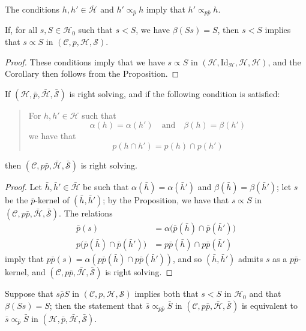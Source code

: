 \documentclass[a4paper,fleqn]{article}
\theoremstyle{plain}
\newenvironment{corollary}[1]
  {\renewcommand\theinnercorollary{#1}\innercorollary}
  {\endinnercorollary}
\theoremstyle{definition}
\newcommand{\textand}{\quad\text{and}\quad}
\newcommand{\CC}{\mathcal{C}}
\newcommand{\HH}{\mathcal{H}}
\newcommand{\bHH}{\bar{\HH}}
\renewcommand{\SS}{\mathcal{S}}
\newcommand{\bSS}{\bar{\SS}}
\newcommand{\relrhobar}{\mathrel{\bar{\rho}}}
\newcommand{\subs}{\mathrel{\propto}}
\newcommand{\Id}{\mathrm{Id}}
\begin{document}
\begin{corollary}{1}
  The conditions $h,h'\in\bHH$ and $h'\subs_{\bar{p}}h$ imply that $h'\subs_{p\bar{p}}h$.
\end{corollary}

\begin{corollary}{2}
  If, for all $s,S\in\HH_0$ such that $s<S$, we have $\beta(Ss)=S$, then $s<S$ implies that $s\subs S$ in $(\CC,p,\HH,\SS)$.
\end{corollary}

\begin{proof}
  These conditions imply that we have $s\subs S$ in $(\HH,\Id_\HH,\HH,\HH)$, and the Corollary then follows from the Proposition.
\end{proof}

\begin{corollary}{3}
  If $(\HH,\bar{p},\bHH,\bSS)$ is right solving, and if the following condition is satisfied:
  \begin{quote}
    For $h,h'\in\HH$ such that
    \[
      \alpha(h)=\alpha(h')
      \textand
      \beta(h)=\beta(h')
    \]
    we have that
    \[
      p(h\cap h')
      = p(h)\cap p(h')
    \]
  \end{quote}
  then $(\CC,p\bar{p},\bHH,\bSS)$ is right solving.
\end{corollary}

\begin{proof}
  Let $\bar{h},\bar{h}'\in\bHH$ be such that $\alpha(\bar{h})=\alpha(\bar{h}')$ and $\beta(\bar{h})=\beta(\bar{h}')$;
  let $s$ be the $\bar{p}$-kernel of $(\bar{h},\bar{h}')$;
  by the Proposition, we have that $s\subs S$ in $(\CC,p\bar{p},\bHH,\bSS)$.
  The relations
  \[
    \begin{aligned}
      \bar{p}(s)
      &= \alpha\big(\bar{p}(\bar{h})\cap\bar{p}(\bar{h}')\big)
    \\p\big(\bar{p}(\bar{h})\cap\bar{p}(\bar{h}')\big)
      &= p\bar{p}(\bar{h})\cap p\bar{p}(\bar{h}')
    \end{aligned}
  \]
  imply that $p\bar{p}(s)=\alpha(p\bar{p}(\bar{h})\cap p\bar{p}(\bar{h}'))$, and so $(\bar{h},\bar{h}')$ admits $s$ as a $p\bar{p}$-kernel, and $(\CC,p\bar{p},\bHH,\bSS)$ is right solving.
\end{proof}

\begin{corollary}{4}
  Suppose that $s\relrhobar S$ in $(\CC,p,\HH,\SS)$ implies both that $s<S$ in $\HH_0$ and that $\beta(Ss)=S$;
  then the statement that $\bar{s}\subs_{p\bar{p}}\bar{S}$ in $(\CC,p\bar{p},\bHH,\bSS)$ is equivalent to $\bar{s}\subs_{\bar{p}}\bar{S}$ in $(\HH,\bar{p},\bHH,\bSS)$.
\end{corollary}
\end{document}
